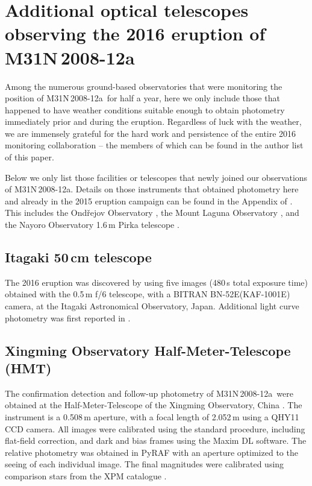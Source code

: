 \documentclass[twocolumn,tighten]{aastex6}
\def\nova{{M31N\,2008-12a~}}
\def\novak{{M31N\,2008-12a}}
\newcommand{\othreek}{\citetalias{2016ApJ...833..149D}}
\begin{document}

 

\appendix

\section{Additional optical telescopes observing the 2016 eruption of \novak}\label{app:optical_photometry}

Among the numerous ground-based observatories that were monitoring the position of \nova for half a year, here we only include those that happened to have weather conditions suitable enough to obtain photometry immediately prior and during the eruption. Regardless of luck with the weather, we are immensely grateful for the hard work and persistence of the entire 2016 monitoring collaboration -- the members of which can be found in the author list of this paper.

Below we only list those facilities or telescopes that newly joined our observations of \novak. Details on those instruments that obtained photometry here and already in the 2015 eruption campaign can be found in the Appendix of \othreek. This includes the Ond\v{r}ejov Observatory \citep{2016ATel.9861....1B, 2016ATel.9883....1H}, the Mount Laguna Observatory \citep[MLO;][]{2016ATel.9857....1E, 2016ATel.9864....1S}, and the Nayoro Observatory 1.6\,m Pirka telescope \citep{2016ATel.9891....1N}.

\subsection{Itagaki 50\,cm telescope}

The 2016 eruption was discovered by \citet{2016ATel.9848....1I} using five images (480\,s total exposure time) obtained with the 0.5\,m f/6 telescope, with a BITRAN BN-52E(KAF-1001E) camera, at the Itagaki Astronomical Observatory, Japan. Additional light curve photometry was first reported in \citet{2016ATel.9891....1N}.

\subsection{Xingming Observatory Half-Meter-Telescope (HMT)}

The confirmation detection and follow-up photometry of \nova were obtained at the Half-Meter-Telescope of the Xingming Observatory, China \citet{2016ATel.9848....1I, 2016ATel.9885....1T}. The instrument is a 0.508\,m aperture, with a focal length of 2.052\,m using a QHY11 CCD camera. 
All images were calibrated using the standard procedure, including flat-field correction, and dark and bias frames using the Maxim DL software. The relative photometry was obtained in PyRAF with an aperture optimized to the seeing of each individual image. The final magnitudes were calibrated using comparison stars from the XPM catalogue \citep{2009MNRAS.393..133F}.
\end{document}
